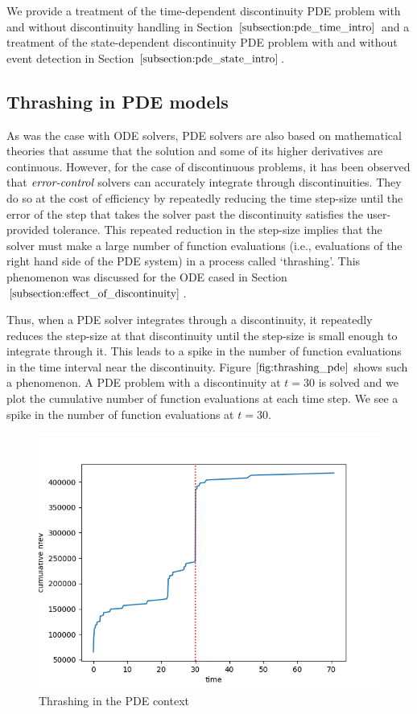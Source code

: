 We provide a treatment of the time-dependent discontinuity PDE problem with and without discontinuity handling in Section $\ref{subsection:pde_time_intro}$ and a treatment of the state-dependent discontinuity PDE problem with and without event detection in Section $\ref{subsection:pde_state_intro}$.

\subsection{Thrashing in PDE models}
\label{subsection:pde_thrashing}
As was the case with ODE solvers, PDE solvers are also based on mathematical theories that assume that the solution and some of its higher derivatives are continuous. However, for the case of discontinuous problems, it has been observed that $\emph{error-control}$ solvers can accurately integrate through discontinuities. They do so at the cost of efficiency by repeatedly reducing the time step-size until the error of the step that takes the solver past the discontinuity satisfies the user-provided tolerance. This repeated reduction in the step-size implies that the solver must make a large number of function evaluations (i.e., evaluations of the right hand side of the PDE system) in a process called `thrashing'. This phenomenon was discussed for the ODE cased in Section $\ref{subsection:effect_of_discontinuity}$.

Thus, when a PDE solver integrates through a discontinuity, it repeatedly reduces the step-size at that discontinuity until the step-size is small enough to integrate through it. This leads to a spike in the number of function evaluations in the time interval near the discontinuity. Figure $\ref{fig:thrashing_pde}$ shows such a phenomenon. A PDE problem with a discontinuity at $t=30$ is solved and we plot the cumulative number of function evaluations at each time step. We see a spike in the number of function evaluations at $t=30$.
\begin{figure}[H]
\centering
\includegraphics[width=0.7\linewidth]{./figures/pde_thrashing}
\caption{Thrashing in the PDE context}
\label{fig:thrashing_pde}
\end{figure}

